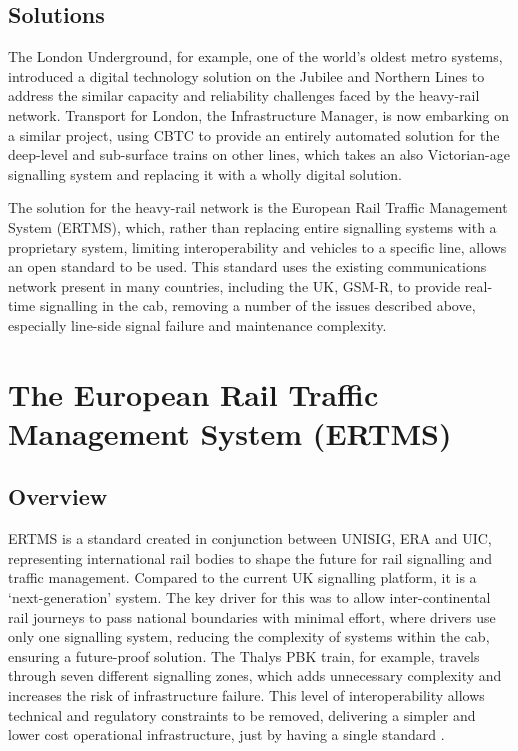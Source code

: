 \documentclass[twoside,11pt,a4paper]{article}
\begin{document}
\subsection{Solutions}
The London Underground, for example, one of the world's oldest metro systems, introduced a digital technology solution on the Jubilee and Northern Lines to address the similar capacity and reliability challenges faced by the heavy-rail network. Transport for London, the Infrastructure Manager, is now embarking on a similar project, using CBTC to provide an entirely automated solution for the deep-level and sub-surface trains on other lines, which takes an also Victorian-age signalling system and replacing it with a wholly digital solution.

The solution for the heavy-rail network is the European Rail Traffic Management System (ERTMS), which, rather than replacing entire signalling systems with a proprietary system, limiting interoperability and vehicles to a specific line, allows an open standard to be used. This standard uses the existing communications network present in many countries, including the UK, GSM-R, to provide real-time signalling in the cab, removing a number of the issues described above, especially line-side signal failure and maintenance complexity.

\clearpage

\section{The European Rail Traffic Management System (ERTMS)}
\subsection{Overview}
ERTMS is a standard created in conjunction between UNISIG, ERA and UIC, representing international rail bodies to shape the future for rail signalling and traffic management. Compared to the current UK signalling platform, it is a `next-generation' system. The key driver for this was to allow inter-continental rail journeys to pass national boundaries with minimal effort, where drivers use only one signalling system, reducing the complexity of systems within the cab, ensuring a future-proof solution. The Thalys PBK train, for example, travels through seven different signalling zones, which adds unnecessary complexity and increases the risk of infrastructure failure. This level of interoperability allows technical and regulatory constraints to be removed, delivering a simpler and lower cost operational infrastructure, just by having a single standard \citep{EuropeanCommission13a}.
\end{document}
